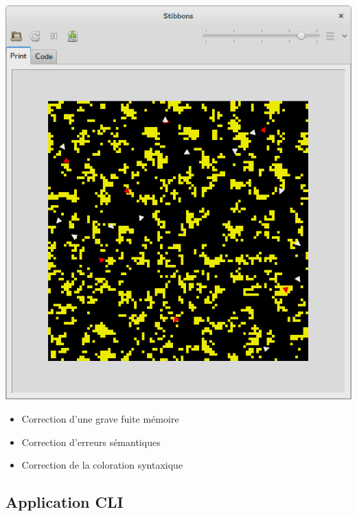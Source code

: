 \begin{frame}
\begin{center}
\includegraphics[scale=0.16]{doc/Presentation/screenshot/stibbons-0-5-3.png}
\end{center}

\begin{itemize}
	\item Correction d'une grave fuite mémoire
	\item Correction d'erreurs sémantiques
	\item Correction de la coloration syntaxique
\end{itemize}
\end{frame}

\subsection{Application CLI}

